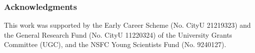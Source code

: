 \subsubsection*{Acknowledgments}
This work was supported by the Early Career Scheme (No. CityU 21219323) and the General Research Fund (No. CityU 11220324) of the University Grants Committee (UGC), and the NSFC Young Scientists Fund (No. 9240127).